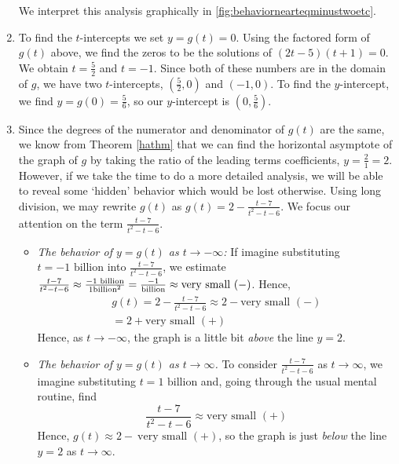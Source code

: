 \begin{ex}
\begin{enumerate}
\begin{itemize}
\end{itemize}

We interpret this analysis graphically in \autoref{fig:behaviornearteqminustwoetc}.

\item  To find the $t$-intercepts  we set $y = g(t) = 0$.  Using the factored form of $g(t)$ above, we find the zeros to be the solutions of $(2t-5)(t+1)=0$.  We obtain $t = \frac{5}{2}$ and $t=-1$. Since both of these numbers are in the domain of $g$, we have two $t$-intercepts, $\left( \frac{5}{2},0\right)$ and $(-1,0)$.  To find the $y$-intercept, we find $y = g(0) = \frac{5}{6}$, so our $y$-intercept is $\left(0, \frac{5}{6}\right)$.

\item  Since the degrees of the numerator and denominator of $g(t)$ are the same, we know from Theorem \ref{hathm} that we can find the horizontal asymptote of the graph of $g$ by taking the ratio of the leading terms coefficients, $y = \frac{2}{1} = 2$.  However, if we take the time to do a more detailed analysis, we will be able to reveal some `hidden' behavior which would be lost otherwise.  Using long division, we may rewrite $g(t)$ as $g(t) = 2 - \frac{t-7}{t^2-t-6}.$  We focus our attention on the term $\frac{t-7}{t^2-t-6}$.  

\begin{itemize}

\item  \textit{The behavior of $y=g(t)$ as $t \rightarrow -\infty$:} If imagine substituting $t = \text{$-1$ billion}$ into $\frac{t-7}{t^2-t-6}$, we estimate $\frac{t-7}{t^2-t-6} \approx \frac{\text{\scriptsize $-1$ billion}}{1 \text{\scriptsize billion}^2}  = \frac{-1}{\text{\scriptsize billion}} \approx \text{very small $(-)$}$.  Hence,
\begin{multline*}
     g(t) =  2 - \frac{t-7}{t^2-t-6} \approx 2 - \text{very small $(-)$} \\
     = 2 + \text{very small $(+)$}
\end{multline*}
Hence, as $t \rightarrow -\infty$, the graph is a little bit \textit{above} the line $y=2$.

\item  \textit{The behavior of $y=g(t)$ as $t \rightarrow \infty$.}  To consider $\frac{t-7}{t^2-t-6}$ as $t \rightarrow \infty$, we imagine substituting $t= \text{$1$ billion}$ and, going through the usual mental routine, find \[\frac{t-7}{t^2-t-6} \approx \text{very small $(+)$}\]  Hence, $g(t) \approx 2 - \ \text{very small $(+)$}$, so the graph is just \textit{below} the line $y=2$ as $t \rightarrow \infty$.


\end{itemize}
\end{enumerate}
\end{ex}
